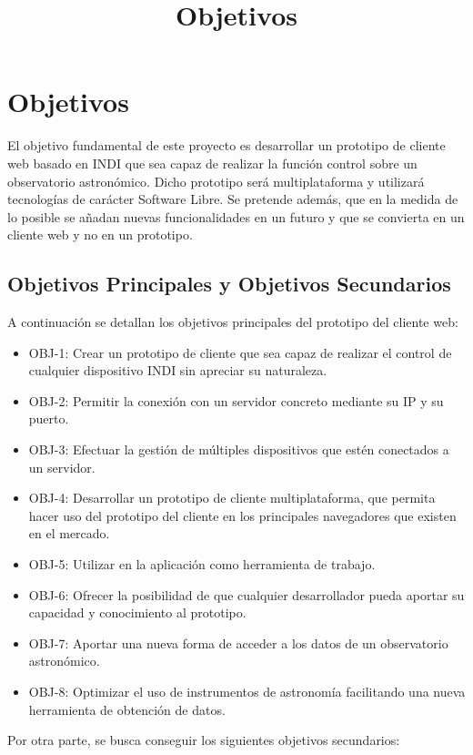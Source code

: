 \chapter{Objetivos}
\title{Objetivos}
\label{cap:Objetivos}

El objetivo fundamental de este proyecto es desarrollar un prototipo de cliente web basado en INDI que sea capaz de realizar la función control sobre un observatorio astronómico. Dicho prototipo será multiplataforma y utilizará tecnologías de carácter Software Libre. Se pretende además, que en la medida de lo posible se añadan nuevas funcionalidades en un futuro y que se convierta en un cliente web y no en un prototipo.


\section{Objetivos Principales y Objetivos Secundarios}
A continuación se detallan los objetivos principales del prototipo del cliente web:

\begin{itemize}
  \item OBJ-1: Crear un prototipo de cliente que sea capaz de realizar el control de cualquier dispositivo INDI sin apreciar su naturaleza.
  \item OBJ-2: Permitir la conexión con un servidor concreto mediante su IP y su puerto.
  \item OBJ-3: Efectuar la gestión de múltiples dispositivos que estén conectados a un servidor.
  \item OBJ-4: Desarrollar un prototipo de cliente multiplataforma, que permita hacer uso del prototipo del cliente en los principales navegadores que existen en el mercado.
  \item OBJ-5: Utilizar  en la aplicación como herramienta de trabajo.
  \item OBJ-6: Ofrecer la posibilidad de que cualquier desarrollador pueda aportar su capacidad y conocimiento al prototipo.
  \item OBJ-7: Aportar una nueva forma de acceder a los datos de un observatorio astronómico.
  \item OBJ-8: Optimizar el uso de instrumentos de astronomía facilitando una nueva herramienta de obtención de datos.
\end{itemize}

Por otra parte, se busca conseguir los siguientes objetivos secundarios:

